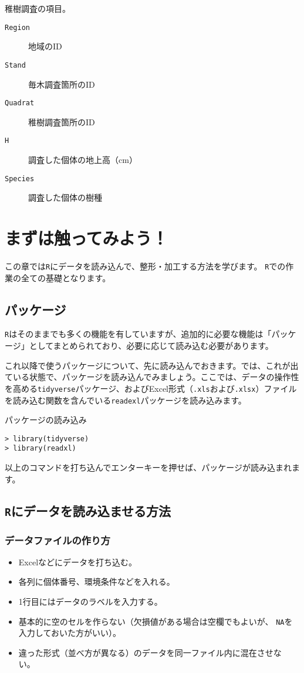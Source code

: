 稚樹調査の項目。
\begin{description}
  \item[\texttt{Region}]地域のID
  \item[\texttt{Stand}]毎木調査箇所のID
  \item[\texttt{Quadrat}]稚樹調査箇所のID
  \item[\texttt{H}]調査した個体の地上高（cm）
  \item[\texttt{Species}]調査した個体の樹種
\end{description}

\section{まずは触ってみよう！}
\label{begin}
この章では\texttt{R}にデータを読み込んで、整形・加工する方法を学びます。
\texttt{R}での作業の全ての基礎となります。
  \subsection{パッケージ}
\texttt{R}はそのままでも多くの機能を有していますが、追加的に必要な機能は「パッケージ」としてまとめられており、必要に応じて読み込む必要があります。

これ以降で使うパッケージについて、先に読み込んでおきます。では、これが出ている状態で、パッケージを読み込んでみましょう。ここでは、データの操作性を高める\verb|tidyverse|パッケージ、およびExcel形式（\verb|.xls|および\verb|.xlsx|）ファイルを読み込む関数を含んでいる\verb|readexl|パッケージを読み込みます。

\begin{itembox}[l]{パッケージの読み込み}
\begin{verbatim}
> library(tidyverse)
> library(readxl)
\end{verbatim}
\end{itembox}

以上のコマンドを打ち込んでエンターキーを押せば、パッケージが読み込まれます。
  
  \subsection{\texttt{R}にデータを読み込ませる方法}
    \subsubsection{データファイルの作り方}
\begin{itemize}
 \item Excelなどにデータを打ち込む。
 \item 各列に個体番号、環境条件などを入れる。
 \item 1行目にはデータのラベルを入力する。
 \item 基本的に空のセルを作らない（欠損値がある場合は空欄でもよいが、
       \verb|NA|を入力しておいた方がいい）。
 \item 違った形式（並べ方が異なる）のデータを同一ファイル内に混在させな
       い。
\end{itemize}

